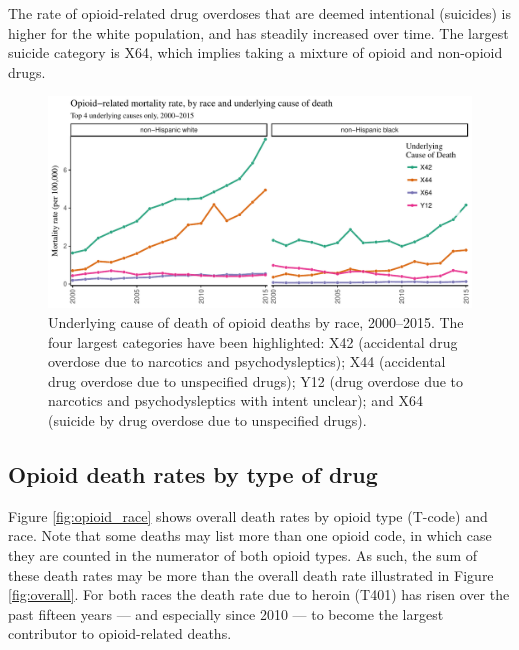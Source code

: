 \documentclass[12pt, a4paper]{article}
\begin{document}
The rate of opioid-related drug overdoses that are deemed intentional (suicides) is higher for the white population, and has steadily increased over time. The largest suicide category is X64, which implies taking a mixture of opioid and non-opioid drugs. 

\begin{figure}[h!]
 \centering
\includegraphics[width=1\textwidth]{./plots/paper_fig3_ucod_adjusted.pdf} 
 \caption{Underlying cause of death of opioid deaths by race, 2000--2015. The four largest categories have been highlighted: X42 (accidental drug overdose due to narcotics and psychodysleptics); X44 (accidental drug overdose due to unspecified drugs); Y12 (drug overdose due to narcotics and psychodysleptics with intent unclear); and X64 (suicide by drug overdose due to unspecified drugs). 
}
 \label{fig:code_race}
\end{figure}

\subsection{Opioid death rates by type of drug}

Figure \ref{fig:opioid_race} shows overall death rates by opioid type (T-code) and race. Note that some deaths may list more than one opioid code, in which case they are counted in the numerator of both opioid types. As such, the sum of these death rates may be more than the overall death rate illustrated in Figure \ref{fig:overall}. For both races the death rate due to heroin (T401) has risen over the past fifteen years --- and especially since 2010 --- to become the largest contributor to opioid-related deaths. 
\end{document}
